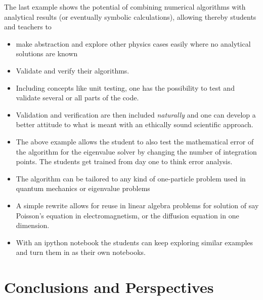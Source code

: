 \documentclass[graybox,envcountchap,sectrefs]{svmult}
\begin{document}
The last example shows the potential of combining numerical algorithms with analytical results (or eventually symbolic calculations), allowing thereby students and teachers to

\begin{itemize}
\item make abstraction and explore other physics cases easily where no analytical solutions are known

\item Validate and verify  their  algorithms.

\item Including concepts like unit testing, one has the possibility to test and validate several or all parts of the code.

\item Validation and verification are then included \emph{naturally} and one can develop a better attitude to what is meant with an ethically sound scientific approach.

\item The above example allows the student to also test the mathematical error of the algorithm for the eigenvalue solver by changing the number of integration points. The students get trained from day one to think error analysis.

\item The algorithm can be tailored to any kind of one-particle problem used in quantum mechanics or eigenvalue problems

\item A simple rewrite allows for reuse in linear algebra problems for solution of say Poisson's equation in electromagnetism, or the diffusion equation in one dimension.

\item With an ipython notebook the students can keep exploring similar examples and turn them in as their own notebooks.
\end{itemize}


\section{Conclusions and Perspectives}
\end{document}
